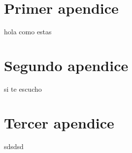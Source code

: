 
\appendix
\chapter{Primer apendice}
hola como estas
\chapter{Segundo apendice}
si te escucho
\chapter{Tercer apendice}
sdsdsd

